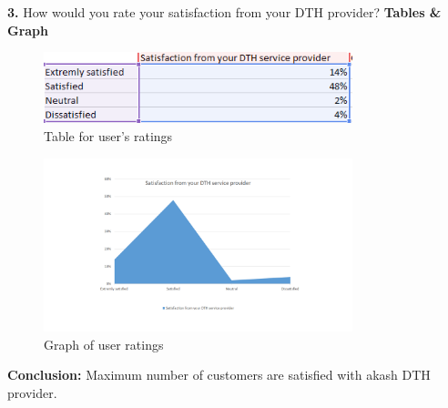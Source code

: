 \begin{spacing}{1}
{\bf 3.} How would you rate your satisfaction from your DTH provider?\newline
{\bf Tables \& Graph}\newline
\begin{figure}[H]
	\centering
	\includegraphics[width=0.8\textwidth]{fig3_2}
	\caption{Table for user's ratings}
	\label{fig:Table2}
\end{figure}
\begin{figure}[H]
	\centering
	\includegraphics[width=0.8\textwidth]{fig3_1}
	\caption{Graph of user ratings}
	\label{fig:g1}
\end{figure}
{\bf Conclusion: }\newline
Maximum number of customers are satisfied with akash DTH provider.


\end{spacing}
